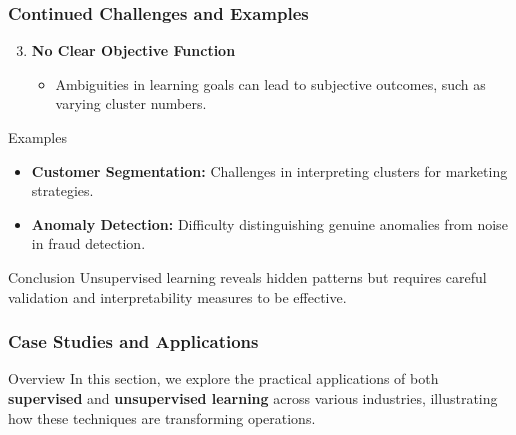 \documentclass[aspectratio=169]{beamer}
\begin{document}
\begin{frame}[fragile]
    \frametitle{Continued Challenges and Examples}
    \begin{enumerate}
        \setcounter{enumi}{2}
        \item \textbf{No Clear Objective Function}
        \begin{itemize}
            \item Ambiguities in learning goals can lead to subjective outcomes, such as varying cluster numbers.
        \end{itemize}
    \end{enumerate}

    \begin{block}{Examples}
        \begin{itemize}
            \item \textbf{Customer Segmentation:} Challenges in interpreting clusters for marketing strategies.
            \item \textbf{Anomaly Detection:} Difficulty distinguishing genuine anomalies from noise in fraud detection.
        \end{itemize}
    \end{block}

    \begin{block}{Conclusion}
        Unsupervised learning reveals hidden patterns but requires careful validation and interpretability measures to be effective.
    \end{block}
\end{frame}

\begin{frame}[fragile]
    \frametitle{Case Studies and Applications}
    \begin{block}{Overview}
        In this section, we explore the practical applications of both \textbf{supervised} and \textbf{unsupervised learning} across various industries, illustrating how these techniques are transforming operations.
    \end{block}
\end{frame}
\end{document}
